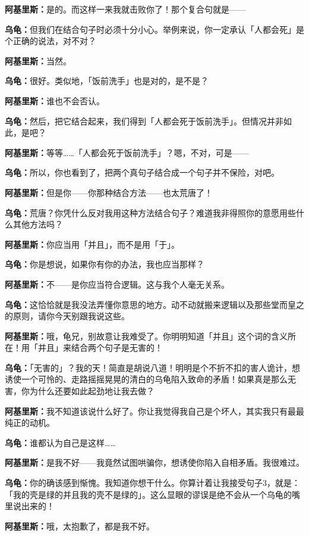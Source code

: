 \documentclass[
  12pt,
  twoside,
  openright,
  oldfontcommands,
]{memoir}
\newcommand{\dialogname}[1]{{\heifamily\bfseries #1}}
\begin{document}
\dialogname{阿基里斯：}是的。而这样一来我就击败你了！那个复合句就是------

\dialogname{乌龟：}但我们在结合句子时必须十分小心。举例来说，你一定承认「人都会死」是个正确的说法，对不对？

\dialogname{阿基里斯：}当然。

\dialogname{乌龟：}很好。类似地，「饭前洗手」也是对的，是不是？

\dialogname{阿基里斯：}谁也不会否认。

\dialogname{乌龟：}然后，把它结合起来，我们得到「人都会死于饭前洗手」。但情况并非如此，是吧？

\dialogname{阿基里斯：}等等\ldots\ldots「人都会死于饭前洗手」？嗯，不对，可是------

\dialogname{乌龟：}所以，你也看到了，把两个真句子结合成一个句子并不保险，对吧。

\dialogname{阿基里斯：}但是你------你那种结合方法------也太荒唐了！

\dialogname{乌龟：}荒唐？你凭什么反对我用这种方法结合句子？难道我非得照你的意愿用些什么其他方法吗？

\dialogname{阿基里斯：}你应当用「并且」，而不是用「于」。

\dialogname{乌龟：}你是想说，如果你有你的办法，我也应当那样？

\dialogname{阿基里斯：}不------是你应当符合逻辑。这与我个人毫无关系。

\dialogname{乌龟：}这恰恰就是我没法弄懂你意思的地方。动不动就搬来逻辑以及那些堂而皇之的原则，请你今天别跟我说这些。

\dialogname{阿基里斯：}哦，龟兄，别故意让我难受了。你明明知道「并且」这个词的含义所在！用「并且」来结合两个句子是无害的！

\dialogname{乌龟：}「无害的」？我的天！简直是胡说八道！明明是个不折不扣的害人诡计，想诱使一个可怜的、走路摇摇晃晃的清白的乌龟陷入致命的矛盾！如果真是那么无害，你为什么还要如此起劲地让我去做？

\dialogname{阿基里斯：}我不知道该说什么好了。你让我觉得我自己是个坏人，其实我只有最最纯正的动机。

\dialogname{乌龟：}谁都认为自己是这样\ldots\ldots{}

\dialogname{阿基里斯：}是我不好------我竟然试图哄骗你，想诱使你陷入自相矛盾。我很难过。

\dialogname{乌龟：}你的确该感到惭愧。我知道你想干什么。你算计着让我接受句子3，就是：「我的壳是绿的并且我的壳不是绿的」。这么显眼的谬误是绝不会从一个乌龟的嘴里说出来的！

\dialogname{阿基里斯：}哦，太抱歉了，都是我不好。
\end{document}
